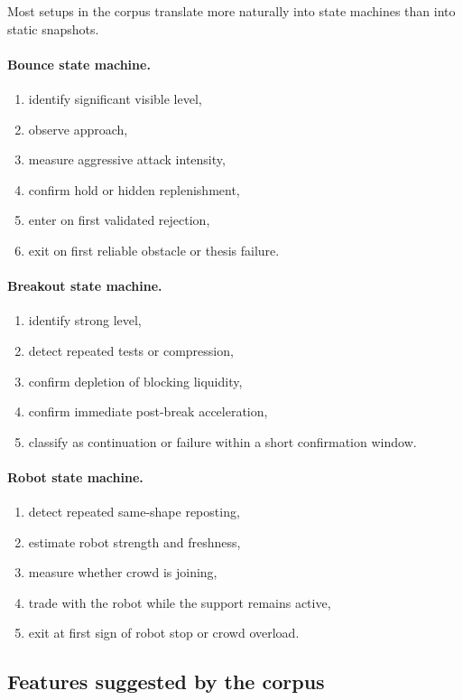 Most setups in the corpus translate more naturally into state machines than into static snapshots.

\paragraph{Bounce state machine.}
\begin{enumerate}
\item identify significant visible level,
\item observe approach,
\item measure aggressive attack intensity,
\item confirm hold or hidden replenishment,
\item enter on first validated rejection,
\item exit on first reliable obstacle or thesis failure.
\end{enumerate}

\paragraph{Breakout state machine.}
\begin{enumerate}
\item identify strong level,
\item detect repeated tests or compression,
\item confirm depletion of blocking liquidity,
\item confirm immediate post-break acceleration,
\item classify as continuation or failure within a short confirmation window.
\end{enumerate}

\paragraph{Robot state machine.}
\begin{enumerate}
\item detect repeated same-shape reposting,
\item estimate robot strength and freshness,
\item measure whether crowd is joining,
\item trade with the robot while the support remains active,
\item exit at first sign of robot stop or crowd overload.
\end{enumerate}

\subsection{Features suggested by the corpus}

